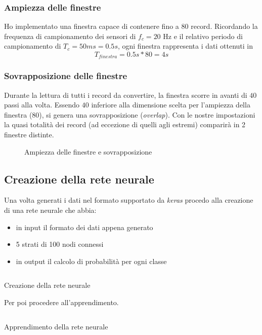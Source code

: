 \subsubsection{Ampiezza delle finestre}
Ho implementato una finestra capace di contenere fino a $80$ record. Ricordando la frequenza di 
campionamento dei sensori di $f_c = 20$ Hz e il relativo periodo di campionamento di $T_c = 50ms = 0.5s$, ogni finestra rappresenta i dati ottenuti in 
$$T_{finestra} = 0.5s * 80 = 4s$$

\subsubsection{Sovrapposizione delle finestre}
Durante la lettura di tutti i record da convertire, la finestra scorre in avanti di $40$ passi alla volta.
Essendo $40$ inferiore alla dimensione scelta per l'ampiezza della finestra ($80$), si genera una sovrapposizione (\textit{overlap}).
Con le nostre impostazioni la quasi totalità dei record (ad eccezione di quelli agli estremi) comparirà in 2 finestre distinte.

\vfill
\begin{figure}[H]
    \centering
    
    \caption{Ampiezza delle finestre e sovrapposizione}
    \label{fig:overlay}
\end{figure}


\newpage
\subsection{Creazione della rete neurale}
Una volta generati i dati nel formato supportato da \textit{keras} procedo alla creazione di 
una rete neurale che abbia:
\begin{itemize}
    \item in input il formato dei dati appena generato
    \item 5 strati di 100 nodi connessi
    \item in output il calcolo di probabilità per ogni classe
\end{itemize}
\begin{listing}[H] 
    \inputminted[frame=single,framesep=10pt]{python}{assets/snippets/classifier/dnn_create.py}
    \caption{Creazione della rete neurale}
\end{listing}
Per poi procedere all'apprendimento.
\begin{listing}[H] 
    \inputminted[frame=single,framesep=10pt]{python}{assets/snippets/classifier/dnn_fit.py}
    \caption{Apprendimento della rete neurale}
\end{listing}


